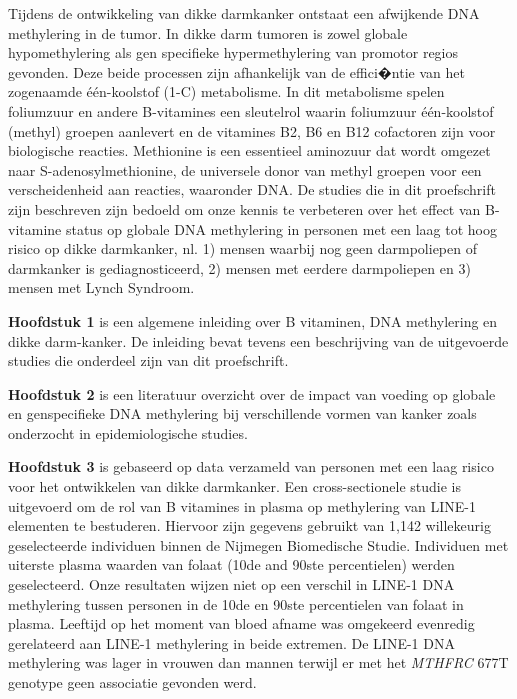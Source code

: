 \noindent Tijdens de ontwikkeling van dikke darmkanker ontstaat een afwijkende DNA methylering in de tumor. In dikke darm tumoren is zowel globale hypomethylering als gen specifieke hypermethylering van promotor regios gevonden. Deze beide processen zijn afhankelijk van de effici�ntie van het zogenaamde \'e\'en-koolstof (1-C) metabolisme. In dit metabolisme spelen foliumzuur en andere B-vitamines een sleutelrol waarin foliumzuur \'e\'en-koolstof (methyl) groepen aanlevert en de vitamines B2, B6 en B12 cofactoren zijn voor biologische reacties. Methionine is een essentieel aminozuur dat wordt omgezet naar S-adenosylmethionine, de universele donor van methyl groepen voor een verscheidenheid aan reacties, waaronder DNA. De studies die in dit proefschrift zijn beschreven zijn bedoeld om onze kennis te verbeteren over het effect van B-vitamine status op globale DNA methylering in personen met een laag tot hoog risico op dikke darmkanker, nl. 1) mensen waarbij nog geen darmpoliepen of darmkanker is gediagnosticeerd, 2) mensen met eerdere darmpoliepen en 3) mensen met Lynch Syndroom.

\noindent \textbf{Hoofdstuk 1} is een algemene inleiding  over B vitaminen, DNA methylering en dikke darm-kanker. De inleiding bevat tevens een beschrijving van de uitgevoerde studies die onderdeel zijn van dit proefschrift.

\noindent \textbf{Hoofdstuk 2} is een literatuur overzicht over de impact van voeding op globale en genspecifieke DNA methylering bij verschillende vormen van kanker zoals onderzocht in epidemiologische studies.

\noindent \textbf{Hoofdstuk 3} is gebaseerd op data verzameld van personen met een laag risico voor het ontwikkelen van dikke darmkanker. Een cross-sectionele studie is uitgevoerd om de rol van B vitamines in plasma op methylering van LINE-1 elementen te bestuderen. Hiervoor zijn gegevens gebruikt van 1,142 willekeurig geselecteerde individuen binnen de Nijmegen Biomedische Studie. Individuen met uiterste plasma waarden van folaat (10de and 90ste percentielen) werden geselecteerd. Onze resultaten wijzen niet op een verschil in LINE-1 DNA methylering tussen personen in de 10de en 90ste percentielen van folaat in plasma. Leeftijd op het moment van bloed afname was omgekeerd evenredig gerelateerd aan LINE-1 methylering in beide extremen. De LINE-1 DNA methylering was lager in vrouwen dan mannen terwijl er met het \emph{MTHFRC} 677T genotype geen associatie gevonden werd.

